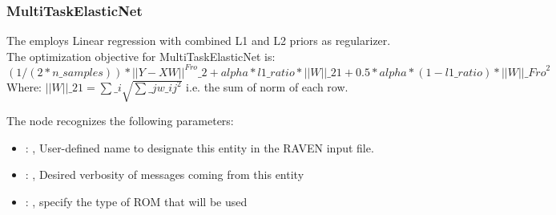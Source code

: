 \subsubsection{MultiTaskElasticNet}
  The  employs                         Linear regression with combined
  L1 and L2 priors as regularizer.                         The optimization objective for
  MultiTaskElasticNet is:                         $(1 / (2 * n\_samples)) * ||Y - XW||^{Fro}\_2
  + alpha * l1\_ratio * ||W||\_{21}                         + 0.5 * alpha * (1 - l1\_ratio) *
  ||W||\_{Fro}^2$                         \\Where:                         $||W||\_{21} = \sum\_i
  \sqrt{\sum\_j w\_{ij}^2}$                         i.e. the sum of norm of each row.

  The  node recognizes the following parameters:
    \begin{itemize}
      \item {}: , 
        User-defined name to designate this entity in the RAVEN input file.
      \item {}: , 
        Desired verbosity of messages coming from this entity
      \item {}: , 
        specify the type of ROM that will be used
  \end{itemize}

